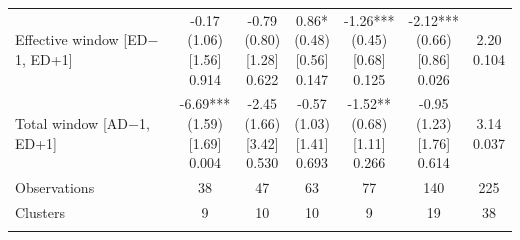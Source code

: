 \begin{threeparttable}
\begin{tabular}{@{}lcccccc}
Effective window [ED$-$1, ED+1] & \makecell{-0.17\\(1.06)\\{}[1.56]\\{0.914}} & \makecell{-0.79\\(0.80)\\{}[1.28]\\{0.622}} & \makecell{0.86*\\(0.48)\\{}[0.56]\\{0.147}} & \makecell{-1.26***\\(0.45)\\{}[0.68]\\{0.125}} & \makecell{-2.12***\\(0.66)\\{}[0.86]\\{0.026}} & \makecell{2.20\\{0.104}} \\
\addlinespace[0.25ex]
\addlinespace[0.25ex]
Total window [AD$-$1, ED+1] & \makecell{-6.69***\\(1.59)\\{}[1.69]\\{0.004}} & \makecell{-2.45\\(1.66)\\{}[3.42]\\{0.530}} & \makecell{-0.57\\(1.03)\\{}[1.41]\\{0.693}} & \makecell{-1.52**\\(0.68)\\{}[1.11]\\{0.266}} & \makecell{-0.95\\(1.23)\\{}[1.76]\\{0.614}} & \makecell{3.14\\{0.037}} \\
\addlinespace[0.25ex]
\addlinespace[0.25ex]
Observations & 38 & 47 & 63 & 77 & 140 & 225 \\
\addlinespace[0.25ex]
\addlinespace[0.25ex]
Clusters & 9 & 10 & 10 & 9 & 19 & 38 \\
\addlinespace[0.25ex]
\bottomrule
\end{tabular}
\endgroup
\noindent\begin{minipage}{\linewidth}\smallskip\footnotesize

\end{minipage}
\end{threeparttable}
